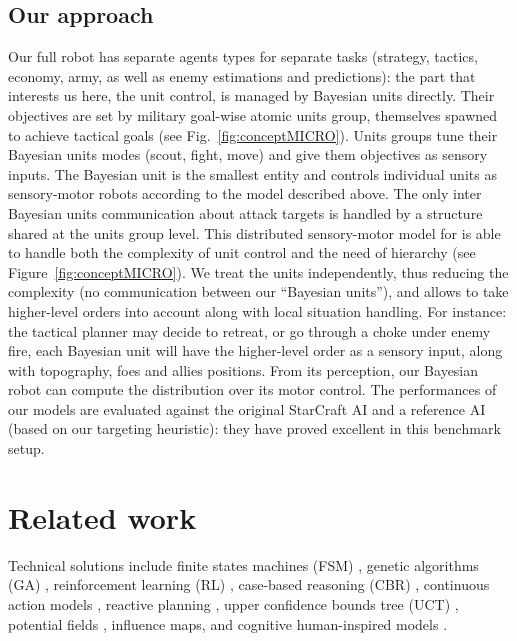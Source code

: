 \subsection{Our approach}
Our full robot has separate agents types for separate tasks (strategy, tactics, economy, army, as well as enemy estimations and predictions): the part that interests us here, the unit control, is managed by Bayesian units directly. Their objectives are set by military goal-wise atomic units group, themselves spawned to achieve tactical goals (see Fig.~\ref{fig:conceptMICRO}). Units groups tune their Bayesian units modes (scout, fight, move) and give them objectives as sensory inputs. The Bayesian unit is the smallest entity and controls individual units as sensory-motor robots according to the model described above. The only inter Bayesian units communication about attack targets is handled by a structure shared at the units group level. This distributed sensory-motor model for  is able to handle both the complexity of unit control and the need of hierarchy (see Figure~\ref{fig:conceptMICRO}). We treat the units independently, thus reducing the complexity (no communication between our ``Bayesian units''), and allows to take higher-level orders into account along with local situation handling. For instance: the tactical planner may decide to retreat, or go through a choke under enemy fire, each Bayesian unit will have the higher-level order as a sensory input, along with topography, foes and allies positions. From its perception, our Bayesian robot \citep{Lebeltel04} can compute the distribution over its motor control. The performances of our models are evaluated against the original StarCraft AI and a reference AI (based on our targeting heuristic): they have proved excellent in this benchmark setup.


\section{Related work}
Technical solutions include finite states machines (FSM) \citep{FSM}, genetic algorithms (GA) \citep{GA,Bakkes04,teamCompositionRTS}, reinforcement learning (RL) \citep{Marthi05concurrenthierarchical,Madeira06}, case-based reasoning (CBR) \citep{LTW,CBR-RL}, continuous action models \citep{Molineaux08}, reactive planning \citep{WeberCIG10}, upper confidence bounds tree (UCT) \citep{UCT}, potential fields \citep{Hagelback2009}, influence maps\citep{teamCompositionRTS}, and cognitive human-inspired models \citep{SORTS}.

